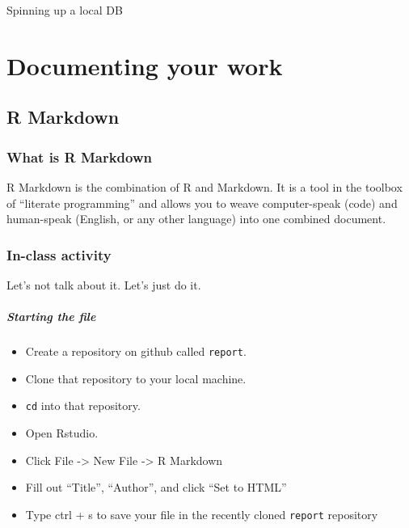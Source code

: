 \documentclass[
]{book}
\providecommand{\tightlist}{%
  \setlength{\itemsep}{0pt}\setlength{\parskip}{0pt}}
\begin{document}
Spinning up a local DB

\hypertarget{part-documenting-your-work}{%
\part{Documenting your work}\label{part-documenting-your-work}}

\hypertarget{rmarkdown}{%
\chapter{R Markdown}\label{rmarkdown}}

\hypertarget{what-is-r-markdown}{%
\section*{What is R Markdown}\label{what-is-r-markdown}}

R Markdown is the combination of R and Markdown. It is a tool in the toolbox of ``literate programming'' and allows you to weave computer-speak (code) and human-speak (English, or any other language) into one combined document.

\hypertarget{in-class-activity}{%
\section*{In-class activity}\label{in-class-activity}}

Let's not talk about it. Let's just do it.

\hypertarget{starting-the-file}{%
\subsubsection*{Starting the file}\label{starting-the-file}}

\begin{itemize}
\tightlist
\item
  Create a repository on github called \texttt{report}.\\
\item
  Clone that repository to your local machine.\\
\item
  \texttt{cd} into that repository.\\
\item
  Open Rstudio.\\
\item
  Click File -\textgreater{} New File -\textgreater{} R Markdown\\
\item
  Fill out ``Title'', ``Author'', and click ``Set to HTML''\\
\item
  Type ctrl + s to save your file in the recently cloned \texttt{report} repository
\end{itemize}
\end{document}
